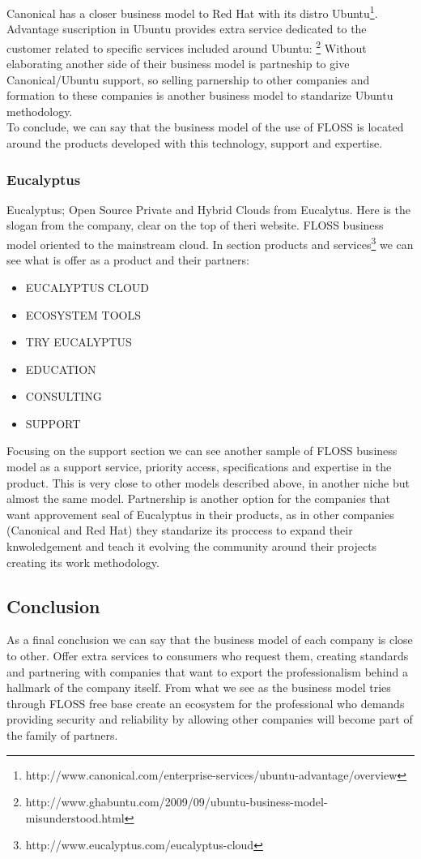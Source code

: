 \documentclass[11pt]{scrartcl}
\begin{document}
 Canonical has a closer business model to Red Hat with its distro Ubuntu\footnote{http://www.canonical.com/enterprise-services/ubuntu-advantage/overview}.
 Advantage suscription in Ubuntu provides extra service dedicated to the customer 
 related to specific services included around Ubuntu:
 \footnote{http://www.ghabuntu.com/2009/09/ubuntu-business-model-misunderstood.html}
 Without elaborating another side of their business model is partneship to give
 Canonical/Ubuntu support, so selling parnership to other companies and formation
 to these companies is another business model to standarize Ubuntu methodology.\\
 To conclude, we can say that the business model of the use of FLOSS is located
  around the products developed with this technology, support and expertise.
 
\subsubsection{Eucalyptus}

 Eucalyptus; Open Source Private and Hybrid Clouds from Eucalytus. Here is the 
 slogan from the company, clear on the top of theri website. FLOSS business model
 oriented to the mainstream cloud.
 In section products and services\footnote{http://www.eucalyptus.com/eucalyptus-cloud} 
 we can see what is offer as a product and their partners:
 \begin{itemize}
  \item EUCALYPTUS CLOUD
  \item ECOSYSTEM TOOLS
  \item TRY EUCALYPTUS
  \item EDUCATION
  \item CONSULTING
  \item SUPPORT
\end{itemize}
 Focusing on the support section we can see another sample of FLOSS business model
 as a support service, priority access, specifications and expertise in the product.
 This is very close to other models described above, in another niche but almost the same
 model.
 Partnership is another option for the companies that want approvement seal of 
 Eucalyptus in their products, as in other companies (Canonical and Red Hat) they 
 standarize its proccess to expand their knwoledgement and teach it evolving the
  community around their projects creating its work methodology.
 
\subsection{Conclusion}

As a final conclusion we can say that the business model of each company is 
close to other. Offer extra services to consumers who request them, 
creating standards and partnering with companies that want to export
 the professionalism behind a hallmark of the company itself. 
From what we see as the business model tries through FLOSS free
 base create an ecosystem for the professional who demands 
providing security and reliability by allowing other companies will become 
part of the family of partners. 
\end{document}

